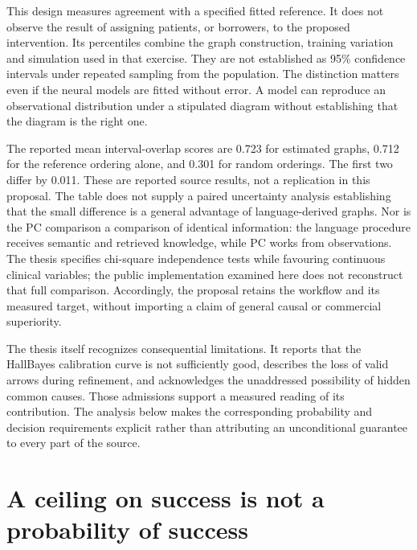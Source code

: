 This design measures agreement with a specified fitted reference. It does
not observe the result of assigning patients, or borrowers, to the proposed
intervention. Its percentiles combine the graph construction, training
variation and simulation used in that exercise. They are not established as
95\% confidence intervals under repeated sampling from the population.
The distinction matters even if the neural models are fitted without error.
A model can reproduce an observational distribution under a stipulated
diagram without establishing that the diagram is the right one.

The reported mean interval-overlap scores are 0.723 for estimated graphs,
0.712 for the reference ordering alone, and 0.301 for random orderings.
The first two differ by 0.011. These are reported source results, not a
replication in this proposal. The table does not supply a paired uncertainty
analysis establishing that the small difference is a general advantage of
language-derived graphs. Nor is the PC comparison a comparison of identical
information: the language procedure receives semantic and retrieved
knowledge, while PC works from observations. The thesis specifies
chi-square independence tests while favouring continuous clinical variables;
the public implementation examined here does not reconstruct that full
comparison. Accordingly, the proposal retains the workflow and its measured
target, without importing a claim of general causal or commercial superiority.
\citep[pp.~54--55, 77--79, Tables 10--11]{closure30molero}

The thesis itself recognizes consequential limitations. It reports that the
HallBayes calibration curve is not sufficiently good, describes the loss of
valid arrows during refinement, and acknowledges the unaddressed possibility
of hidden common causes. Those admissions support a measured reading of its
contribution. The analysis below makes the corresponding probability and
decision requirements explicit rather than attributing an unconditional
guarantee to every part of the source.
\citep[pp.~68--69 and 79]{closure30molero}

\section{A ceiling on success is not a probability of success}

